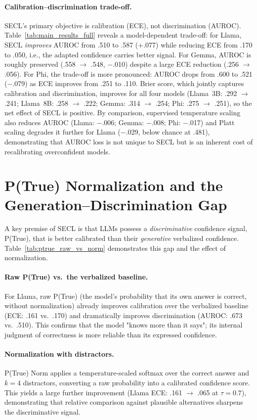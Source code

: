 \paragraph{Calibration--discrimination trade-off.}
SECL's primary objective is calibration (ECE), not discrimination (AUROC).
Table~\ref{tab:main_results_full} reveals a model-dependent trade-off:
for Llama, SECL \emph{improves} AUROC from .510 to .587 (+.077)
while reducing ECE from .170 to .050,
i.e., the adapted confidence carries better signal.
For Gemma, AUROC is roughly preserved (.558 $\to$ .548, $-$.010)
despite a large ECE reduction (.256 $\to$ .056).
For Phi, the trade-off is more pronounced:
AUROC drops from .600 to .521 ($-$.079) as ECE improves from .251 to .110.
Brier score, which jointly captures calibration and
discrimination, improves for all four models
(Llama~3B: .292 $\to$ .241; Llama~8B: .258 $\to$ .222; Gemma: .314 $\to$ .254; Phi: .275 $\to$ .251),
so the net effect of SECL is positive.
By comparison, supervised temperature scaling also reduces AUROC
(Llama: $-$.006; Gemma: $-$.008; Phi: $-$.017)
and Platt scaling degrades it further for Llama ($-$.029, below chance at .481),
demonstrating that AUROC loss is not unique to SECL but is an inherent
cost of recalibrating overconfident models.

\section{P(True) Normalization and the Generation--Discrimination Gap} \label{app:ptrue_norm}

A key premise of SECL is that LLMs possess a \emph{discriminative} 
confidence signal, P(True), that is better calibrated than their 
\emph{generative} verbalized confidence.
Table~\ref{tab:ptrue_raw_vs_norm} demonstrates this gap and the 
effect of normalization.

\paragraph{Raw P(True) vs.\ the verbalized baseline.}
For Llama, raw P(True) (the model's probability that its own answer 
is correct, without normalization) already improves calibration over 
the verbalized baseline (ECE: .161 vs.\ .170) and dramatically improves 
discrimination (AUROC: .673 vs.\ .510).
This confirms that the model "knows more than it says"; its 
internal judgment of correctness is more reliable than its 
expressed confidence.

\paragraph{Normalization with distractors.}
P(True) Norm applies a temperature-scaled softmax over the correct 
answer and $k{=}4$ distractors, converting a raw probability into a 
calibrated confidence score.
This yields a large further improvement (Llama ECE: .161 $\to$ .065 
at $\tau{=}0.7$), demonstrating that relative comparison against 
plausible alternatives sharpens the discriminative signal.


